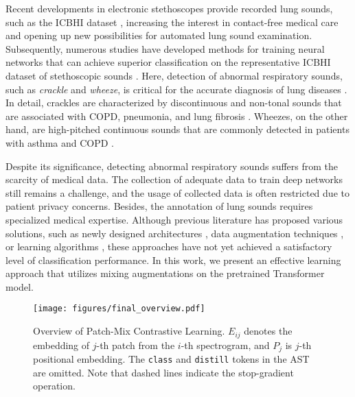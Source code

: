 \documentclass{INTERSPEECH2023}
\begin{document}
Recent developments in electronic stethoscopes provide recorded lung sounds, such as the ICBHI dataset \cite{rocha2018alpha}, increasing the interest in contact-free medical care and opening up new possibilities for automated lung sound examination.
Subsequently, numerous studies have developed methods for training neural networks that can achieve superior classification on the representative ICBHI dataset of stethoscopic sounds  \cite{ma2020lungrn+,yang2020adventitious, gairola2021respirenet, nguyen2022lung}.
Here, detection of abnormal respiratory sounds, such as \textit{crackle} and \textit{wheeze}, is critical for the accurate diagnosis of lung diseases \cite{bohadana2014fundamentals}.
In detail, crackles are characterized by discontinuous and non-tonal sounds that are associated with COPD, pneumonia, and lung fibrosis \cite{flietstra2011automated}.
Wheezes, on the other hand, are high-pitched continuous sounds that are commonly detected in patients with asthma and COPD \cite{bohadana2014fundamentals, reichert2008analysis}. 






Despite its significance, detecting abnormal respiratory sounds suffers from the scarcity of medical data. 
The collection of adequate data to train deep networks still remains a challenge, and the usage of collected data is often restricted due to patient privacy concerns. Besides, the annotation of lung sounds requires specialized medical expertise.
Although previous literature has proposed various solutions, such as newly designed architectures \cite{ma2020lungrn+, nguyen2022lung, ma2019lungbrn}, data augmentation techniques \cite{ma2020lungrn+, gairola2021respirenet, wang2022domain}, or learning algorithms \cite{gairola2021respirenet, nguyen2022lung, moummad2022supervised}, these approaches have not yet achieved a satisfactory level of classification performance.
In this work, we present an effective learning approach that utilizes mixing augmentations on the pretrained Transformer model.


\begin{figure}[!t]
    \vspace{-2.5pt}
    \centering
    \texttt{[image: figures/final\_overview.pdf]}
    \vspace{-5pt}
    \caption{Overview of Patch-Mix Contrastive Learning. $E_{ij}$ denotes the embedding of $j$-th patch from the $i$-th spectrogram, and $P_j$ is $j$-th positional embedding. The \texttt{class} and \texttt{distill} tokens in the AST are omitted. Note that dashed lines indicate the stop-gradient operation.}
    \label{fig:overview}
    \vspace{-12pt}
\end{figure}
\end{document}
